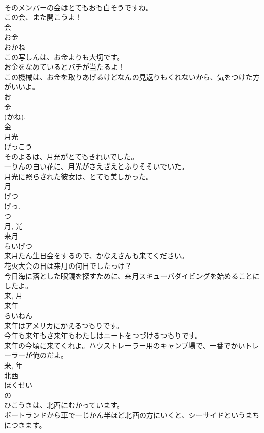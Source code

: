 \documentclass[8pt]{extreport}
\begin{document}
\begin{CJK}{UTF8}{min}
\\	そのメンバーの会はとてもおも白そうですね。	
\\	この会、また開こうよ！	
\\	会	
\\	お金	
\\	おかね	
\\	この写しんは、お金よりも大切です。	
\\	お金をなめているとバチが当たるよ！	
\\	この機械は、お金を取りあげるけどなんの見返りもくれないから、気をつけた方がいいよ。	
\\	お 
\\	金 
\\	(かね). 
\\	金	
\\	月光	
\\	げっこう	
\\	そのよるは、月光がとてもきれいでした。	
\\	一りんの白い花に、月光がさえざえとふりそそいでいた。	
\\	月光に照らされた彼女は、とても美しかった。	
\\	月 
\\	げつ 
\\	げっ. 
\\	つ 
\\	月, 光	
\\	来月	
\\	らいげつ	
\\	来月たん生日会をするので、かなえさんも来てください。	
\\	花火大会の日は来月の何日でしたっけ？	
\\	今日海に落とした眼鏡を探すために、来月スキューバダイビングを始めることにしたよ。	
\\	来, 月	
\\	来年	
\\	らいねん	
\\	来年はアメリカにかえるつもりです。	
\\	今年も来年もさ来年もわたしはニートをつづけるつもりです。	
\\	来年の今頃に来てくれよ。ハウストレーラー用のキャンプ場で、一番でかいトレーラーが俺のだよ。	
\\	来, 年	
\\	北西	
\\	ほくせい	
\\	の 
\\	ひこうきは、北西にむかっています。	
\\	ポートランドから車で一じかん半ほど北西の方にいくと、シーサイドというまちにつきます。	

\end{CJK}
\end{document}
